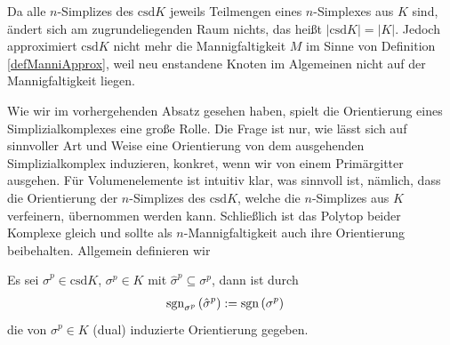     \begin{bemerkung}
      Da alle \( n \)-Simplizes des \(\text{csd}K  \) jeweils Teilmengen eines \( n \)-Simplexes aus \( K \) sind, ändert sich am zugrundeliegenden Raum nichts, das heißt
      \( |\text{csd}K| = |K| \). 
      Jedoch approximiert \(\text{csd}K\) nicht mehr die Mannigfaltigkeit \( M \) im Sinne von Definition \ref{defManniApprox}, weil neu enstandene Knoten im Algemeinen nicht auf der Mannigfaltigkeit
      liegen. 
    \end{bemerkung}

    Wie wir im vorhergehenden Absatz gesehen haben, spielt die Orientierung eines Simplizialkomplexes eine große Rolle. Die Frage ist nur,
    wie lässt sich auf sinnvoller Art und Weise eine Orientierung von dem ausgehenden Simplizialkomplex induzieren, konkret, wenn wir von
    einem Primärgitter ausgehen.
    Für Volumenelemente ist intuitiv klar, was sinnvoll ist, nämlich, dass die Orientierung der \( n \)-Simplizes des  \( \text{csd}K \),
    welche die \( n \)-Simplizes aus  \( K \) verfeinern, übernommen werden kann. Schließlich ist das Polytop beider Komplexe gleich und
    sollte als \( n \)-Mannigfaltigkeit auch ihre Orientierung beibehalten.
    Allgemein definieren wir

    \begin{definition}
      \label{defDualInduzierteOrientierung}
      Es sei \( \hat{\sigma}^{p} \in \text{csd}K \), \( \sigma^{p} \in K \) mit \( \hat{\sigma}^{p} \subseteq \sigma^{p}\), dann ist durch
      \begin{align}
        \mathop{\mathrm{sgn}}\nolimits_{\sigma^{p}}\left( \hat{\sigma}^{p} \right) &:= \mathop{\mathrm{sgn}}\nolimits\left( \sigma^{p} \right)
      \end{align}
      die von \( \sigma^{p}\in K \) (dual) induzierte Orientierung gegeben. 
    \end{definition}

